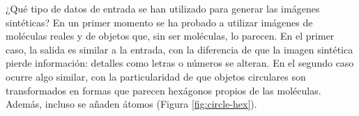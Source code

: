 \begin{figure}[H]
\centering
\end{figure}

¿Qué tipo de datos de entrada se han utilizado para generar las imágenes sintéticas? En un primer momento se ha probado a utilizar imágenes de moléculas reales y de objetos que, sin ser moléculas, lo parecen. En el primer caso, la salida es similar a la entrada, con la diferencia de que la imagen sintética pierde información: detalles como letras o números se alteran. En el segundo caso ocurre algo similar, con la particularidad de que objetos circulares son transformados en formas que parecen hexágonos propios de las moléculas. Además, incluso se añaden átomos (Figura \ref{fig:circle-hex}).

